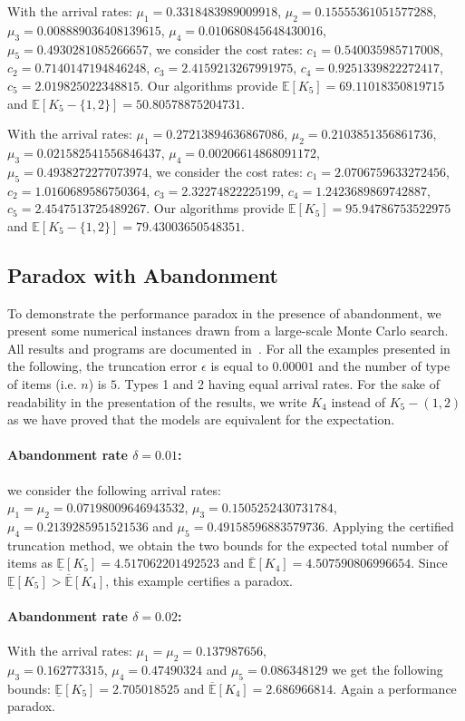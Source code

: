 \documentclass[11pt]{article}
\begin{document}
{With the arrival rates: $\mu_1=0.3318483989009918$, $\mu_2=0.15555361051577288$,
$\mu_3=0.008889036408139615$,
$\mu_4=0.010680845648430016$,
$\mu_5=0.4930281085266657$,
we consider the cost rates:
$c_1=0.540035985717008$,
$c_2=0.7140147194846248$,
$c_3=2.4159213267991975$,
$c_4=0.9251339822272417$,
$c_5=2.019825022348815$. Our
algorithms provide $\mathbb{E}[K_5]=69.11018350819715$ and $\mathbb{E}[K_5-\{1,2\}]=50.80578875204731$.

With the arrival rates: $\mu_1=0.27213894636867086$, $\mu_2=0.2103851356861736$,
$\mu_3=0.021582541556846437$,
$\mu_4=0.00206614868091172$,
$\mu_5=0.4938272277073974$,
we consider the cost rates:
$c_1=2.0706759633272456$,
$c_2=1.0160689586750364$,
$c_3=2.32274822225199$,
$c_4=1.2423689869742887$,
$c_5=2.4547513725489267$. Our
algorithms provide $\mathbb{E}[K_5]=95.94786753522975$ and $\mathbb{E}[K_5-\{1,2\}]=79.43003650548351$.

\subsection{Paradox with Abandonment}
To demonstrate the performance paradox in the presence of abandonment, we present some numerical instances drawn 
from a large-scale Monte Carlo search. All results and programs 
are documented in~\cite{li2025a}. For all the examples 
presented in the following,
the truncation error $\epsilon$ is equal to $0.00001$ 
and the number of type of items (i.e. $n$) is $5$. 
Types 1 and 2 having equal arrival rates. For 
the sake of readability in the presentation of 
the results, we write $K_4$
instead of $K_5 - (1,2)$ as we have proved that the models are equivalent for the expectation. 

\paragraph{Abandonment rate $\delta=0.01$:}
we consider the following arrival rates:\\
$\mu_1=\mu_2=0.07198009646943532$, $\mu_3=0.1505252430731784$, \\
$\mu_4=0.2139285951521536$ and $\mu_5=0.49158596883579736$. 
Applying the certified truncation method, we obtain the two bounds for the expected total number of items as $\underline{\mathbb{E}}[K_5] = 4.517062201492523$ and 
$\overline{\mathbb{E}}[K_4] = 4.507590806996654$. Since $\underline{\mathbb{E}}[K_5] > \overline{\mathbb{E}}[K_4]$, this example certifies a paradox.

\paragraph{Abandonment rate $\delta=0.02$:}
With the arrival rates:
$\mu_1=\mu_2=0.137987656$,\\ $\mu_3=0.162773315$, 
$\mu_4=0.47490324$ and $\mu_5=0.086348129$
we get the following bounds: 
$\underline{\mathbb{E}}[K_5] = 2.705018525$ and 
$\overline{\mathbb{E}}[K_4] = 2.686966814$. Again a 
performance paradox.

}
\end{document}
